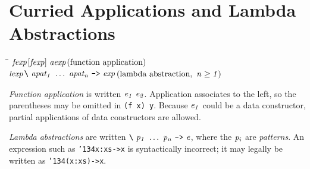 

\section{Curried Applications and Lambda Abstractions}
\label{applications}
\label{lambda-abstractions}
%
\begin{flushleft}\it\begin{tabbing}
\hspace{0.6in}\=\hspace{3.1in}\=\kill
$\it fexp$\>\makebox[3.5em]{$\rightarrow$}$\it [fexp]\ aexp$\>\makebox[3em]{}$\it (\mbox{{\rm function\ application}})$\\ 
$\it lexp$\>\makebox[3.5em]{$\rightarrow$}$\it \makebox{\tt {\char'134}}\ apat_1\ \ldots \ apat_n\ \makebox{\tt ->}\ exp$\>\makebox[3em]{}$\it (\mbox{{\rm lambda\ abstraction}},\ n\geq 1)$
\end{tabbing}\end{flushleft}
%
%

\noindent
{\em Function application} is written 
\mbox{$\it e_1\ e_2$}.  Application associates to the left, so the
parentheses may be omitted in \mbox{\tt (f\ x)\ y}.  Because \mbox{$\it e_1$} could
be a data constructor, partial applications of data constructors are
allowed. 

{\em Lambda abstractions} are written 
\mbox{$\it \makebox{\tt {\char'134}}\ p_1\ \ldots \ p_n\ \makebox{\tt ->}\ e$}, where the \mbox{$\it p_i$} are {\em patterns}.
An expression such as \mbox{\tt {\char'134}x:xs->x} is syntactically incorrect;
it may legally be written as \mbox{\tt {\char'134}(x:xs)->x}.

